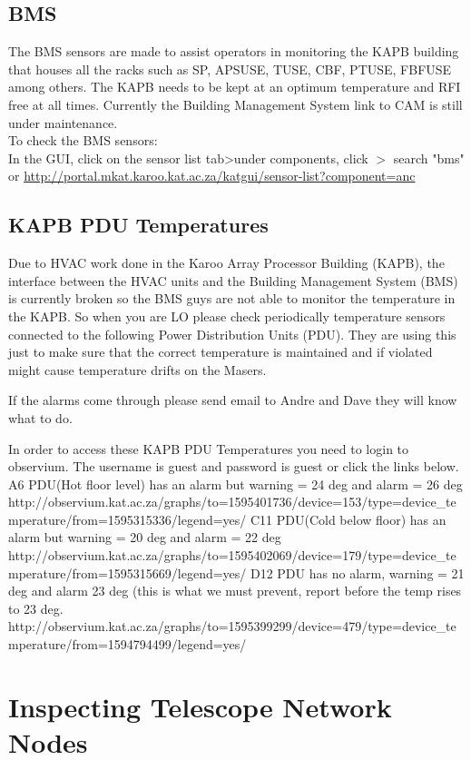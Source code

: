 \subsection{ BMS} 
The BMS sensors are made to assist operators in monitoring the KAPB building that houses all the racks  such as SP, APSUSE, TUSE, CBF, PTUSE, FBFUSE among others. The KAPB needs to be kept at an optimum temperature and RFI free at all times. 
Currently the Building Management System  link to CAM is still under maintenance. \\
To check the BMS sensors:\\
In the GUI, click on the sensor list tab>under components, click  $>$ search "bms" or 
\url{http://portal.mkat.karoo.kat.ac.za/katgui/sensor-list?component=anc}
\subsection{ KAPB PDU Temperatures}
Due to HVAC work done in the Karoo Array Processor Building (KAPB), the interface between the HVAC units and the Building Management System (BMS) is currently broken so the BMS guys are not able to monitor the temperature in the KAPB.  So when you are LO please check periodically temperature sensors connected to the following Power Distribution Units (PDU). They are using this just to make sure that the correct temperature is maintained and if violated might cause temperature drifts on the Masers.

If the alarms come through please send email to Andre and Dave they will know what to do.

In order to access these KAPB PDU Temperatures you need to login to observium.
The username is guest and password is guest or click the links below.
A6 PDU(Hot floor level) has an alarm but warning = 24 deg and alarm = 26 deg http://observium.kat.ac.za/graphs/to=1595401736/device=153/type=device\_temperature/from=1595315336/legend=yes/
C11 PDU(Cold below floor) has an alarm but warning = 20 deg and alarm = 22 deg
http://observium.kat.ac.za/graphs/to=1595402069/device=179/type=device\_temperature/from=1595315669/legend=yes/
D12 PDU has no alarm, warning = 21 deg and alarm 23 deg (this is what we must prevent, report before the temp rises to 23 deg. 
http://observium.kat.ac.za/graphs/to=1595399299/device=479/type=device\_temperature/from=1594794499/legend=yes/

\section{ Inspecting Telescope Network Nodes}
